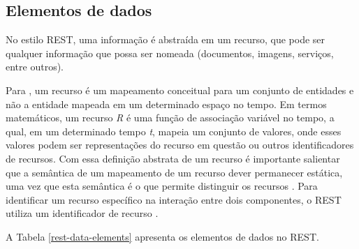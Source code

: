   \subsection{Elementos de dados}
    
    No estilo REST, uma informação é abstraída em um recurso, que pode ser qualquer informação que possa ser nomeada
    (documentos, imagens, serviços, entre outros).
    
    Para , um recurso é um mapeamento conceitual para um conjunto de entidades e não a entidade mapeada
    em um determinado espaço no tempo. Em termos matemáticos, um recurso \textit{R} é uma função de associação variável no tempo, a qual, em um 
    determinado tempo \textit{t}, mapeia um conjunto de valores, onde esses valores podem ser representações do recurso em questão ou
    outros identificadores de recursos.
    Com essa definição abstrata de um recurso é importante salientar que a semântica de um mapeamento de um recurso dever permanecer
    estática, uma vez que esta semântica é o que permite distinguir os recursos \cite{fielding2002}.
    Para identificar um recurso específico na interação entre dois componentes, o REST utiliza um identificador de recurso \cite{fielding2002}.
    
    A Tabela \ref{rest-data-elements} apresenta os elementos de dados no REST.
    
